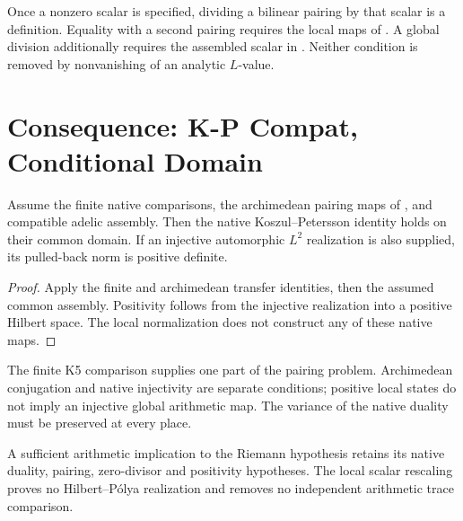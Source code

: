 \begin{remark}
\label{v4-arith:bcglue-k5:rem:K5-delta}
Once a nonzero scalar is specified, dividing a bilinear pairing by
that scalar is a definition. Equality with a second pairing requires
the local maps of
.
A global division additionally requires the assembled scalar in
.
Neither condition is removed by nonvanishing of an analytic
\(L\)-value.
\end{remark}

\section{Consequence: K-P Compat, Conditional Domain}
\label{v4-arith:bcglue-k5:K-P-unconditional}

\begin{corollary}
\label{v4-arith:bcglue-k5:cor:K-P-unconditional}
Assume the finite native comparisons, the archimedean pairing maps of
, and compatible adelic
assembly. Then the native Koszul--Petersson identity holds on their
common domain. If an injective automorphic \(L^2\) realization is also
supplied, its pulled-back norm is positive definite.
\end{corollary}
\begin{proof}
Apply the finite and archimedean transfer identities, then the assumed
common assembly. Positivity follows from the injective realization into
a positive Hilbert space. The local normalization does not construct
any of these native maps.
\end{proof}

\begin{remark}
\label{v4-arith:bcglue-k5:rem:P3-impact}
The finite K5 comparison supplies one part of the pairing problem.
Archimedean conjugation and native injectivity are separate conditions;
positive local states do not imply an injective global arithmetic map.
The variance of the native duality must be preserved at every place.
\end{remark}

\begin{remark}
\label{v4-arith:bcglue-k5:rem:RH-impact}
A sufficient arithmetic implication to the Riemann hypothesis retains
its native duality, pairing, zero-divisor and positivity hypotheses.
The local scalar rescaling proves no Hilbert--P\'olya realization and
removes no independent arithmetic trace comparison.
\end{remark}


